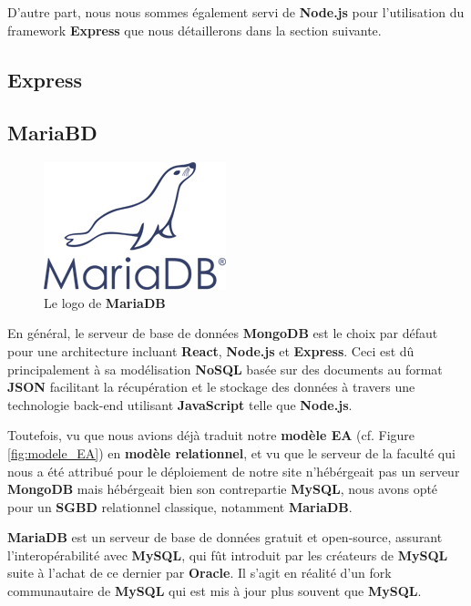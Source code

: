 \documentclass[a4paper,12pt]{report}
\theoremstyle{break}
\theoremstyle{break}
\theoremstyle{break}
\theoremstyle{break}
\theoremstyle{definition}
\theoremstyle{remark}
\begin{document}
D'autre part, nous nous sommes également servi de \textbf{Node.js} pour l'utilisation du framework \textbf{Express} que nous détaillerons dans la section suivante.
\subsection{Express}
\subsection{MariaBD}
\begin{figure}[!ht]
  \centering
  \includegraphics[scale=0.5]{images/mariadb_icon.png}
  \caption{Le logo de \textbf{MariaDB}}
\end{figure}

En général, le serveur de base de données \textbf{MongoDB} est le choix par défaut pour une architecture incluant \textbf{React}, \textbf{Node.js} et \textbf{Express}. Ceci est dû principalement à sa modélisation \textbf{NoSQL} basée sur des documents au format \textbf{JSON} facilitant la récupération et le stockage des données à travers une technologie back-end utilisant \textbf{JavaScript} telle que \textbf{Node.js}.

Toutefois, vu que nous avions déjà traduit notre \textbf{modèle EA} (cf. Figure \ref{fig:modele_EA}) en \textbf{modèle relationnel}, et vu que le serveur de la faculté qui nous a été attribué pour le déploiement de notre site n'hébérgeait pas un serveur \textbf{MongoDB} mais hébérgeait bien son contrepartie \textbf{MySQL}, nous avons opté pour un \textbf{SGBD} relationnel classique, notamment \textbf{MariaDB}.

\textbf{MariaDB} est un serveur de base de données gratuit et open-source, assurant l'interopérabilité avec \textbf{MySQL}, qui fût introduit par les créateurs de \textbf{MySQL} suite à l'achat de ce dernier par \textbf{Oracle}. Il s'agit en réalité d'un fork communautaire de \textbf{MySQL} qui est mis à jour plus souvent que \textbf{MySQL}.
\end{document}
